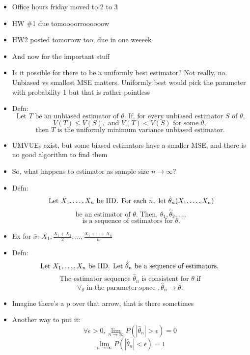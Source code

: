 \documentclass{article}
\begin{document}
  \begin{itemize}
    \item Office hours friday moved to 2 to 3
    \item HW \#1 due tomoooorroooooow
    \item HW2 posted tomorrow too, due in one weeeek
    \item And now for the important stuff
    \item Is it possible for there to be a uniformly best estimator? Not really, no. Unbiased vs smallest MSE matters. Uniformly best would pick the parameter with probability 1 but that is rather pointless
    \item Defn:
      \[
        \text{ Let } T \text{ be an unbiased estimator of } \theta. \text{ If, for every unbiased estimator  } S \text{ of } \theta, 
      \] 
      \[
        V(T) \leq V(S), \text{ and } V(T) < V(S) \text{ for some } \theta,
      \]
      \[\text{ then } T \text{ is the uniformly minimum variance unbiased estimator. }  
      \] 
    \item UMVUEs exist, but some biased estimators have a smaller MSE, and there is no good algorithm to find them
    \item So, what happens to estimator as sample size $ n \rightarrow \infty $?
    \item Defn:
      \[
        \text{ Let } X_1, \ldots, X_n \text{ be IID\@. For each } n, \text{ let } \hat{\theta}_n (X_1, \ldots, X_n)
      \] 
      \[
        \text{ be an estimator of } \theta. \text{ Then, } \hat{\theta}_1, \hat{\theta}_2, \ldots, 
      \] 
      \[
        \text{ is a sequence of estimators for } \theta.
      \] 
    \item Ex for $ \bar{x} $: $ X_1, \frac{X_1 + X_2}{2}, \ldots, \frac{X_1 + \cdots + X_n}{n} $
    \item Defn:
      \[
        \text{ Let } X_1, \ldots, X_n \text{ be IID\@. Let } \hat{\theta}_n \text{ be a sequence of estimators. }
      \] 
      \[
        \text{ The estimator sequence } \hat{\theta}_n \text{ is consistent for } \theta \text{ if }
      \] \[
        \forall_\theta \text{ in the parameter space }, \hat{\theta}_n \rightarrow \theta.
      \] 
    \item Imagine there's a p over that arrow, that is there sometimes
    \item Another way to put it:
      \[
        \forall \epsilon > 0, \lim_{n \to \infty} P\left( \left| \hat{\theta}_n \right| > \epsilon\right) = 0
      \] 
      \[
        \lim_{n \to \infty} P\left( \left| \hat{\theta}_n \right| < \epsilon\right) = 1
\]
\end{itemize}
\end{document}
